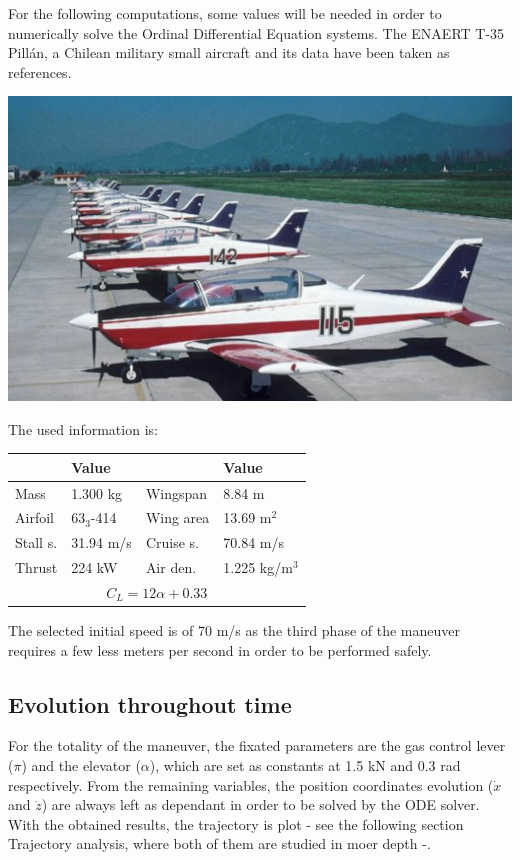 For the following computations, some values will be needed in order to numerically solve the Ordinal Differential Equation systems. The ENAERT T-35 Pillán, a Chilean military small aircraft and its data \cite{jane1969jane} have been taken as references.\\

\begin{center}
	\includegraphics[width=0.9\linewidth]{figures/pillan}
	\vspace{0.5cm}
	\vspace{0.25cm}
\end{center}

The used information is:

\begin{center}
\begin{tabular}{|l|l||l|l|}\hline
	 & Value &   & Value\\ \hline \hline
	Mass & 1.300 kg& Wingspan & 8.84 m\\ \hline
	Airfoil & 63$_3$-414 & Wing area & 13.69 m$^2$ \\ \hline
	Stall s. & 31.94 m/s &  Cruise s. & 70.84 m/s\\ \hline
	Thrust &224 kW & Air den. & 1.225 kg/m$^3$ \\ \hline
	\multicolumn{4}{|c|}{$C_L=12\alpha+0.33$}\\ \hline	
\end{tabular}
\end{center}

The selected initial speed is of 70 m/s as the third phase of the maneuver requires a few less meters per second in order to be performed safely.

\subsection*{Evolution throughout time}
For the totality of the maneuver, the fixated parameters are the gas control lever ($\pi$) and the elevator ($\alpha$), which are set as constants at 1.5 kN and 0.3 rad respectively. From the remaining variables, the position coordinates evolution ($\Dot{x}$ and $\Dot{z}$) are always left as dependant in order to be solved by the ODE solver. With the obtained results, the trajectory is plot - see the following section Trajectory analysis, where both of them are studied in moer depth -.

